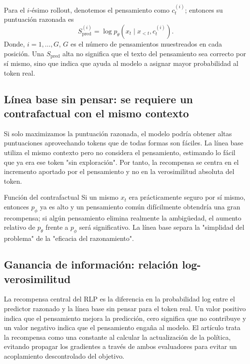 Para el $i$-ésimo rollout, denotemos el pensamiento como $c_t^{(i)}$; entonces su puntuación razonada es
\[
S_{\mathrm{pred}}^{(i)}
=\log p_\theta(x_t\mid x_{<t},c_t^{(i)}).
\]
Donde, $i=1,\ldots,G$, $G$ es el número de pensamientos muestreados en cada posición. Una $S_{\mathrm{pred}}$ alta no significa que el texto del pensamiento sea correcto por sí mismo, sino que indica que ayuda al modelo a asignar mayor probabilidad al token real.

\subsection{Línea base sin pensar: se requiere un contrafactual con el mismo contexto}

Si solo maximizamos la puntuación razonada, el modelo podría obtener altas puntuaciones aprovechando tokens que de todas formas son fáciles. La línea base utiliza el mismo contexto pero no considera el pensamiento, estimando lo fácil que ya era ese token "sin exploración". Por tanto, la recompensa se centra en el incremento aportado por el pensamiento y no en la verosimilitud absoluta del token.


\begin{importantbox}{Función del contrafactual}
Si un mismo $x_t$ era prácticamente seguro por sí mismo, entonces $p_\phi$ ya es alto y un pensamiento común difícilmente obtendría una gran recompensa; si algún pensamiento elimina realmente la ambigüedad, el aumento relativo de $p_\theta$ frente a $p_\phi$ será significativo. La línea base separa la "simplidad del problema" de la "eficacia del razonamiento".
\end{importantbox}

\subsection{Ganancia de información: relación log-verosimilitud}

La recompensa central del RLP es la diferencia en la probabilidad log entre el predictor razonado y la línea base sin pensar para el token real. Un valor positivo indica que el pensamiento mejora la predicción, cero significa que no contribuye y un valor negativo indica que el pensamiento engaña al modelo. El artículo trata la recompensa como una constante al calcular la actualización de la política, evitando propagar los gradientes a través de ambos evaluadores para evitar un acoplamiento descontrolado del objetivo.


